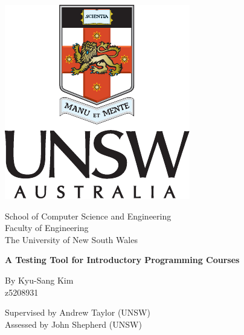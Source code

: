 \documentclass[hidelinks]{report}
\begin{document}
\begin{titlepage}

\vspace*{\fill}

\begin{center}
    \includegraphics{unsw}
\end{center}

\vspace{0.5cm}

\begin{center}
    \Large{}School of Computer Science and Engineering\\
    Faculty of Engineering\\
    The University of New South Wales
\end{center}

\vspace{1cm}

\begin{center}
    \Huge \textbf{A Testing Tool for Introductory Programming Courses}
\end{center}

\vspace{0.35cm}

\begin{center}
    \Large{}By Kyu-Sang Kim\\
    {\normalsize z5208931}
    
    \vspace{0.25cm}
    
    Supervised by Andrew Taylor (UNSW)\\
    Assessed by John Shepherd (UNSW)
\end{center}

\vspace{0.75cm}


\end{titlepage}
\end{document}
